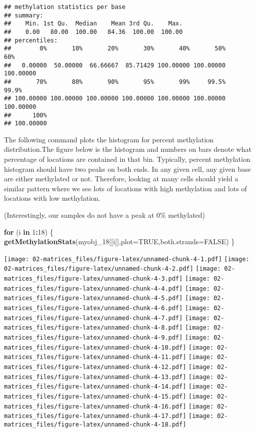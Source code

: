 \documentclass[]{article}
\newenvironment{Shaded}{\begin{snugshade}}{\end{snugshade}}
\newcommand{\KeywordTok}[1]{\textcolor[rgb]{0.13,0.29,0.53}{\textbf{#1}}}
\newcommand{\DataTypeTok}[1]{\textcolor[rgb]{0.13,0.29,0.53}{#1}}
\newcommand{\DecValTok}[1]{\textcolor[rgb]{0.00,0.00,0.81}{#1}}
\newcommand{\OtherTok}[1]{\textcolor[rgb]{0.56,0.35,0.01}{#1}}
\newcommand{\ControlFlowTok}[1]{\textcolor[rgb]{0.13,0.29,0.53}{\textbf{#1}}}
\newcommand{\OperatorTok}[1]{\textcolor[rgb]{0.81,0.36,0.00}{\textbf{#1}}}
\newcommand{\NormalTok}[1]{#1}
\begin{document}
\begin{verbatim}
## methylation statistics per base
## summary:
##    Min. 1st Qu.  Median    Mean 3rd Qu.    Max. 
##    0.00   80.00  100.00   84.36  100.00  100.00 
## percentiles:
##        0%       10%       20%       30%       40%       50%       60% 
##   0.00000  50.00000  66.66667  85.71429 100.00000 100.00000 100.00000 
##       70%       80%       90%       95%       99%     99.5%     99.9% 
## 100.00000 100.00000 100.00000 100.00000 100.00000 100.00000 100.00000 
##      100% 
## 100.00000
\end{verbatim}

The following command plots the histogram for percent methylation
distribution.The figure below is the histogram and numbers on bars
denote what percentage of locations are contained in that bin.
Typically, percent methylation histogram should have two peaks on both
ends. In any given cell, any given base are either methylated or not.
Therefore, looking at many cells should yield a similar pattern where we
see lots of locations with high methylation and lots of locations with
low methylation.

(Interestingly, our samples do not have a peak at 0\% methylated)

\begin{Shaded}
\begin{Highlighting}[]
\ControlFlowTok{for}\NormalTok{ (i }\ControlFlowTok{in} \DecValTok{1}\OperatorTok{:}\DecValTok{18}\NormalTok{) \{}
 \KeywordTok{getMethylationStats}\NormalTok{(myobj_}\DecValTok{18}\NormalTok{[[i]],}\DataTypeTok{plot=}\OtherTok{TRUE}\NormalTok{,}\DataTypeTok{both.strands=}\OtherTok{FALSE}\NormalTok{) }
\NormalTok{\}}
\end{Highlighting}
\end{Shaded}

\texttt{[image: 02-matrices\_files/figure-latex/unnamed-chunk-4-1.pdf]}
\texttt{[image: 02-matrices\_files/figure-latex/unnamed-chunk-4-2.pdf]}
\texttt{[image: 02-matrices\_files/figure-latex/unnamed-chunk-4-3.pdf]}
\texttt{[image: 02-matrices\_files/figure-latex/unnamed-chunk-4-4.pdf]}
\texttt{[image: 02-matrices\_files/figure-latex/unnamed-chunk-4-5.pdf]}
\texttt{[image: 02-matrices\_files/figure-latex/unnamed-chunk-4-6.pdf]}
\texttt{[image: 02-matrices\_files/figure-latex/unnamed-chunk-4-7.pdf]}
\texttt{[image: 02-matrices\_files/figure-latex/unnamed-chunk-4-8.pdf]}
\texttt{[image: 02-matrices\_files/figure-latex/unnamed-chunk-4-9.pdf]}
\texttt{[image: 02-matrices\_files/figure-latex/unnamed-chunk-4-10.pdf]}
\texttt{[image: 02-matrices\_files/figure-latex/unnamed-chunk-4-11.pdf]}
\texttt{[image: 02-matrices\_files/figure-latex/unnamed-chunk-4-12.pdf]}
\texttt{[image: 02-matrices\_files/figure-latex/unnamed-chunk-4-13.pdf]}
\texttt{[image: 02-matrices\_files/figure-latex/unnamed-chunk-4-14.pdf]}
\texttt{[image: 02-matrices\_files/figure-latex/unnamed-chunk-4-15.pdf]}
\texttt{[image: 02-matrices\_files/figure-latex/unnamed-chunk-4-16.pdf]}
\texttt{[image: 02-matrices\_files/figure-latex/unnamed-chunk-4-17.pdf]}
\texttt{[image: 02-matrices\_files/figure-latex/unnamed-chunk-4-18.pdf]}
\end{document}
